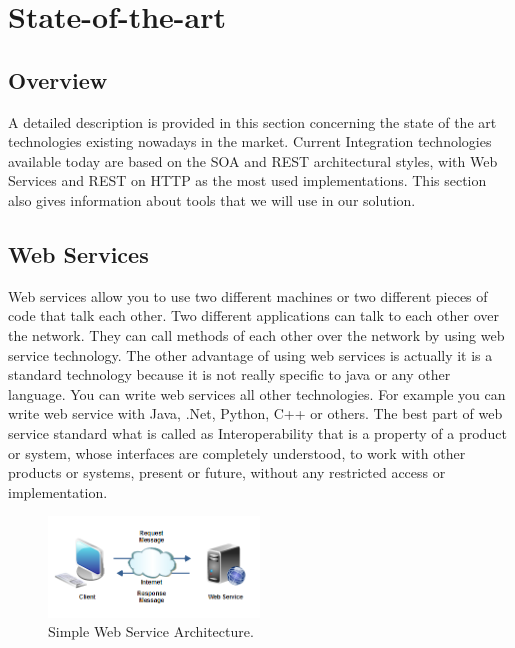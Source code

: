 \chapter{State-of-the-art}
\label{chapter:stateofart}

\section{Overview}
\label{section:overview}
A detailed description is provided in this section concerning the state of the art technologies existing nowadays in the
market. Current Integration technologies available today are based on the SOA and REST architectural styles, with Web Services
and REST on HTTP as the most used implementations. This section also gives information about tools that we will use in our
solution.


\section{Web Services}
\label{section:webservices}

Web services allow you to use two different machines or two different pieces of code that talk each other. Two different
applications can talk to each other over the network. They can call methods of each other over the network by using web
service technology. The other advantage of using web services is actually it is a standard technology because it is not
really specific to java or any other language. You can write web services all other technologies. For example you can write
web service with Java, .Net, Python, C++ or others. The best part of web service standard what is called as Interoperability
that  is a property of a product or system, whose interfaces are completely understood, to work with other products or
systems, present or future, without any restricted access or implementation\citep{interoperability:2016:Online}.\\

\begin{figure}[!htb]
  \centering
  \includegraphics[width=0.5\textwidth]{Figures/web-service-message-formats-1.png}
  \caption[Simple Web Service Architecture.]{Simple Web Service Architecture.}
  \label{fig:webservice}
\end{figure}

